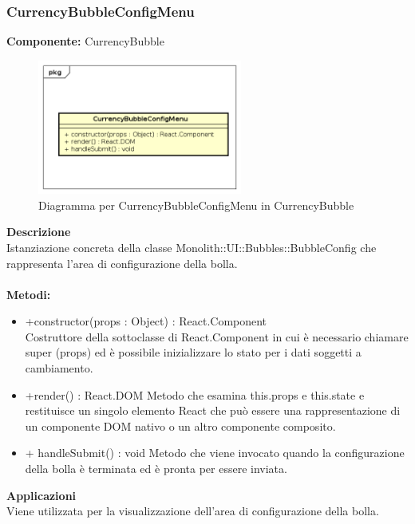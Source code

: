\subsubsection{CurrencyBubbleConfigMenu}
\textbf{Componente:}  CurrencyBubble\\
   \FloatBarrier
   \begin{figure}[ht]
   \centering
   \includegraphics[width=0.6\textwidth]{img/single-CurrencyBubbleConfigMenu}
   \caption{{Diagramma per CurrencyBubbleConfigMenu in CurrencyBubble}}
\end{figure}
\FloatBarrier
\textbf{Descrizione}\\
Istanziazione concreta della classe Monolith::UI::Bubbles::BubbleConfig che rappresenta l'area di configurazione della bolla. 
\\
\\
\textbf{Metodi:} 
\begin{itemize}
\item +constructor(props : Object) : React.Component 
\\
Costruttore della sottoclasse di React.Component in cui è necessario chiamare super (props) ed è possibile inizializzare lo stato per i dati soggetti a cambiamento.

\item +render() : React.DOM
Metodo che esamina this.props e this.state e restituisce un singolo elemento React che può essere una rappresentazione di un componente DOM nativo o un altro componente composito.

\item + handleSubmit() : void
Metodo che viene invocato quando la configurazione della bolla è terminata ed è pronta per essere inviata.

\end{itemize} 


\textbf{Applicazioni}\\
Viene utilizzata per la visualizzazione dell'area di configurazione della bolla. 


